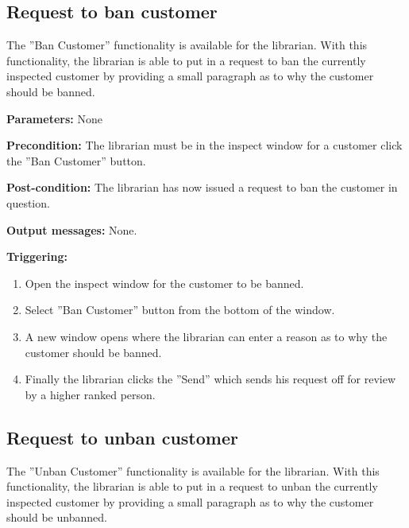 \subsection{Request to ban customer}

The ''Ban Customer'' functionality is available for the librarian. With this
functionality, the librarian is able to put in a request to ban the currently
inspected customer by providing a small paragraph as to why the customer should
be banned.

\begin{description}

\item \textbf{Parameters:} None

\item \textbf{Precondition:} The librarian must be in the inspect window for a
customer click the ''Ban Customer'' button.

\item \textbf{Post-condition:} The librarian has now issued a request to ban the
customer in question.

\item \textbf{Output messages:} None.

\item \textbf{Triggering:}
\begin{enumerate}
\item Open the inspect window for the customer to be banned.
\item Select ''Ban Customer'' button from the bottom of the window.
\item A new window opens where the librarian can enter a reason as to why the
customer should be banned.
\item Finally the librarian clicks the ''Send'' which sends his request off for
review by a higher ranked person.
\end{enumerate}

\end{description}

\subsection{Request to unban customer}

The ''Unban Customer'' functionality is available for the librarian. With this
functionality, the librarian is able to put in a request to unban the currently
inspected customer by providing a small paragraph as to why the customer should
be unbanned.

